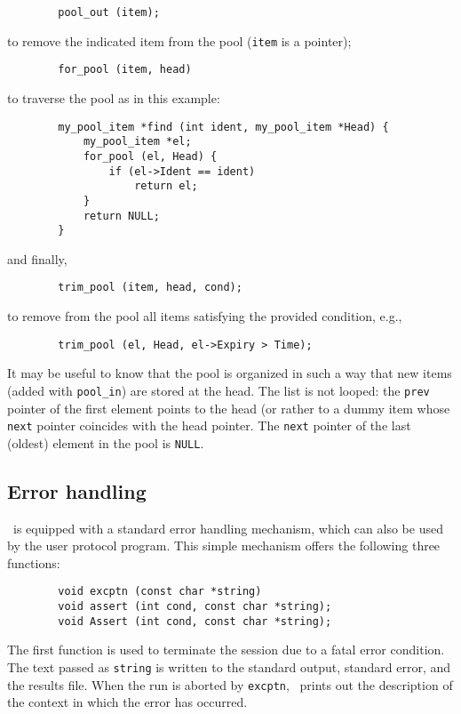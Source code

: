\begin{verbatim}
        pool_out (item);
\end{verbatim}
\noindent
to remove the indicated item from the pool ({\tt item} is a pointer);

\begin{verbatim}
        for_pool (item, head)
\end{verbatim}
to traverse the pool as in this example:
\begin{verbatim}
        my_pool_item *find (int ident, my_pool_item *Head) {
            my_pool_item *el;
            for_pool (el, Head) {
                if (el->Ident == ident)
                    return el;
            }
            return NULL;
        }
\end{verbatim}
\noindent
and finally,
\begin{verbatim}
        trim_pool (item, head, cond);
\end{verbatim}
\noindent
to remove from the pool all items satisfying the provided condition, e.g.,
\begin{verbatim}
        trim_pool (el, Head, el->Expiry > Time);
\end{verbatim}

It may be useful to know that the pool is organized in such a way that new
items (added with {\tt pool\_in}) are stored at the head.
The list is not looped: the {\tt prev} pointer of the first element points to
the head (or rather to a dummy item whose {\tt next} pointer coincides
with the head pointer.
The {\tt next} pointer of the last (oldest) element in the pool is {\tt NULL}.

\subsection{Error handling}
\label{rm_au_eh}

\smurph\ is equipped with a standard error handling mechanism, which can also
be used by the user protocol program.
This simple mechanism offers the following three functions:
\begin{verbatim}
        void excptn (const char *string)
        void assert (int cond, const char *string);
        void Assert (int cond, const char *string);
\end{verbatim}

The first function is used to terminate the session due to a fatal error
condition. The text passed as {\tt string} is written to the standard
output, standard error, and the results file.
When the run is aborted by {\tt excptn}, \smurph\ prints out the
description of the context in which the error has occurred.

